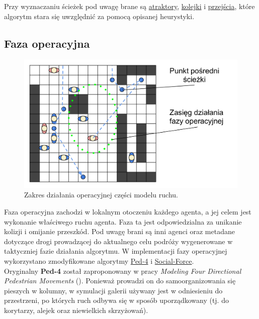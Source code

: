 \documentclass[a4paper, 12pt]{article}
\begin{document}
Przy wyznaczaniu ścieżek pod uwagę brane są \hyperref[sec:attractors]{atraktory}, \hyperref[sec:queues]{kolejki} i \hyperref[sec:entrance-exits]{przejścia}, które algorytm stara się uwzględnić za pomocą opisanej heurystyki.

\newpage
        \subsection{Faza operacyjna}
        \label{sec:operational}

        \begin{figure}[H]
            \centering
            \includegraphics[scale=0.3]{./img/Operative.pdf}
            \caption{Zakres działania operacyjnej części modelu ruchu.}
            \label{fig:operational}
        \end{figure}


\noindent
Faza operacyjna zachodzi w lokalnym otoczeniu każdego agenta, a jej celem jest wykonanie właściwego ruchu agenta. Faza ta jest odpowiedzialna za unikanie kolizji i omijanie przeszkód. Pod uwagę brani są inni agenci oraz metadane dotyczące drogi prowadzącej do aktualnego celu podróży wygenerowane w taktyczniej fazie działania algorytmu. W implementacji fazy operacyjnej wykorzystano zmodyfikowane algorytmy \hyperref[sec:movement-impl]{Ped-4} i \hyperref[sec:social-force-impl]{Social-Force}. \\

Oryginalny \textbf{Ped-4} został zaproponowany w pracy \textit{Modeling Four Directional Pedestrian Movements} (\cite{refs:4-way-movement}). Ponieważ prowadzi on do samoorganizowania się pieszych w kolumny, w symulacji galerii używany jest w odniesieniu do przestrzeni, po których ruch odbywa się w sposób uporządkowany (tj. do korytarzy, alejek oraz niewielkich skrzyżowań). \\
\end{document}
